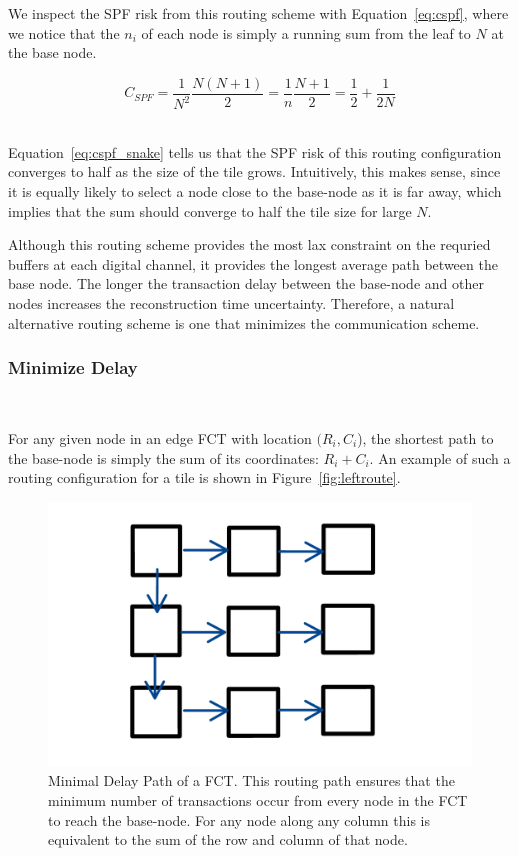 We inspect the SPF risk from this routing scheme with Equation~\ref{eq:cspf}, where we notice that the $n_{i}$ of each node is simply a running sum from the leaf to $N$ at the base node.

\begin{equation}
  C_{SPF} = \frac{1}{N^{2}}\frac{N(N+1)}{2} = \frac{1}{n}\frac{N+1}{2} = \frac{1}{2} + \frac{1}{2N}
\end{equation}~\label{eq:cspf_snake}

Equation~\ref{eq:cspf_snake} tells us that the SPF risk of this routing configuration converges to half as the size of the tile grows.
Intuitively, this makes sense, since it is equally likely to select a node close to the base-node as it is far away, which implies that the sum should converge to half the tile size for large $N$.

Although this routing scheme provides the most lax constraint on the requried buffers at each digital channel, it provides the longest average path between the base node.
The longer the transaction delay between the base-node and other nodes increases the reconstruction time uncertainty.
Therefore, a natural alternative routing scheme is one that minimizes the communication scheme.

\subsubsection{Minimize Delay}~\label{sec:min_comm}

For any given node in an edge FCT with location $(R_{i},C_{i}$), the shortest path to the base-node is simply the sum of its coordinates: $R_{i}+C_{i}$.
An example of such a routing configuration for a tile is shown in Figure~\ref{fig:leftroute}.

\begin{figure}[]
\centering
\includegraphics[width=\textwidth]{images/leftroute.pdf}
\caption{Minimal Delay Path of a FCT. This routing path ensures that the minimum number of transactions occur from every node in the FCT to reach the base-node. For any node along any column this is equivalent to the sum of the row and column of that node.}
\end{figure}~\label{fig:leftroute}

